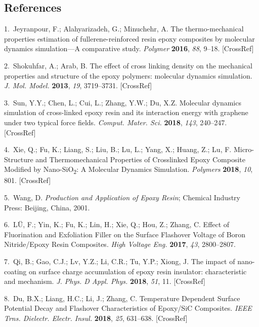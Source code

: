 \documentclass{article}
\begin{document}

\subsection*{References}

\begin{hangpars}\small
1.\ Jeyranpour, F.; Alahyarizadeh, G.; Minuchehr, A. The thermo-mechanical properties estimation of fullerene-reinforced resin epoxy composites by molecular dynamics simulation—A comparative study. \emph{Polymer} \textbf{2016}, \emph{88}, 9–18. [CrossRef]

2.\ Shokuhfar, A.; Arab, B. The effect of cross linking density on the mechanical properties and structure of the epoxy polymers: molecular dynamics simulation. \emph{J. Mol. Model.} \textbf{2013}, \emph{19}, 3719–3731. [CrossRef]

3.\ Sun, Y.Y.; Chen, L.; Cui, L.; Zhang, Y.W.; Du, X.Z. Molecular dynamics simulation of cross-linked epoxy resin and its interaction energy with graphene under two typical force fields. \emph{Comput. Mater. Sci.} \textbf{2018}, \emph{143}, 240–247. [CrossRef]

4.\ Xie, Q.; Fu, K.; Liang, S.; Liu, B.; Lu, L.; Yang, X.; Huang, Z.; Lu, F. Micro-Structure and Thermomechanical Properties of Crosslinked Epoxy Composite Modified by Nano-SiO\textsubscript{2}: A Molecular Dynamics Simulation. \emph{Polymers} \textbf{2018}, \emph{10}, 801. [CrossRef]

5.\ Wang, D. \emph{Production and Application of Epoxy Resin}; Chemical Industry Press: Beijing, China, 2001.

6.\ LÜ, F.; Yin, K.; Fu, K.; Lin, H.; Xie, Q.; Hou, Z.; Zhang, C. Effect of Fluorination and Exfoliation Filler on the Surface Flashover Voltage of Boron Nitride/Epoxy Resin Composites. \emph{High Voltage Eng.} \textbf{2017}, \emph{43}, 2800–2807.

7.\ Qi, B.; Gao, C.J.; Lv, Y.Z.; Li, C.R.; Tu, Y.P.; Xiong, J. The impact of nano-coating on surface charge accumulation of epoxy resin insulator: characteristic and mechanism. \emph{J. Phys. D Appl. Phys.} \textbf{2018}, \emph{51}, 11. [CrossRef]

8.\ Du, B.X.; Liang, H.C.; Li, J.; Zhang, C. Temperature Dependent Surface Potential Decay and Flashover Characteristics of Epoxy/SiC Composites. \emph{IEEE Trns. Dielectr. Electr. Insul.} \textbf{2018}, \emph{25}, 631–638. [CrossRef]


\end{hangpars}
\end{document}
